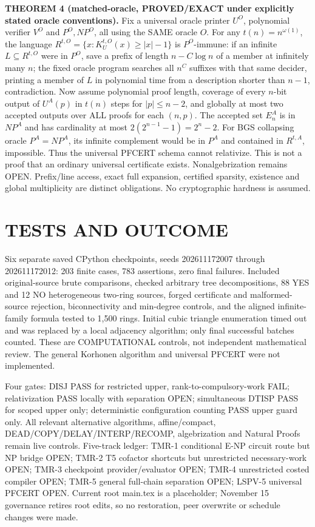 \documentclass{article}
\begin{document}
\textbf{THEOREM 4 (matched-oracle, PROVED/EXACT under explicitly stated oracle conventions).}
Fix a universal oracle printer $U^O$, polynomial verifier $V^O$ and $P^O,NP^O$, all using the SAME oracle $O$. For any $t(n)=n^{\omega(1)}$, the language $R^{t,O}=\{x:K_U^{t,O}(x)\ge |x|-1\}$ is $P^O$-immune: if an infinite $L\subseteq R^{t,O}$ were in $P^O$, save a prefix of length $n-C\log n$ of a member at infinitely many $n$; the fixed oracle program searches all $n^{C}$ suffixes with that same decider, printing a member of $L$ in polynomial time from a description shorter than $n-1$, contradiction. Now assume polynomial proof length, coverage of every $n$-bit output of $U^A(p)$ in $t(n)$ steps for $|p|\le n-2$, and globally at most two accepted outputs over ALL proofs for each $(n,p)$. The accepted set $E_n^A$ is in $NP^A$ and has cardinality at most $2(2^{n-1}-1)=2^n-2$. For BGS collapsing oracle $P^A=NP^A$, its infinite complement would be in $P^A$ and contained in $R^{t,A}$, impossible. Thus the universal PFCERT schema cannot relativize. This is not a proof that an ordinary universal certificate exists. Nonalgebrization remains OPEN. Prefix/line access, exact full expansion, certified sparsity, existence and global multiplicity are distinct obligations. No cryptographic hardness is assumed.

\section{TESTS AND OUTCOME}
Six separate saved CPython checkpoints, seeds 202611172007 through 202611172012: 203 finite cases, 783 assertions, zero final failures. Included original-source brute comparisons, checked arbitrary tree decompositions, 88 YES and 12 NO heterogeneous two-ring sources, forged certificate and malformed-source rejection, biconnectivity and min-degree controls, and the aligned infinite-family formula tested to 1,500 rings. Initial cubic triangle enumeration timed out and was replaced by a local adjacency algorithm; only final successful batches counted. These are COMPUTATIONAL controls, not independent mathematical review. The general Korhonen algorithm and universal PFCERT were not implemented.

Four gates: DISJ PASS for restricted upper, rank-to-compulsory-work FAIL; relativization PASS locally with separation OPEN; simultaneous DTISP PASS for scoped upper only; deterministic configuration counting PASS upper guard only. All relevant alternative algorithms, affine/compact, DEAD/COPY/DELAY/INTERP/RECOMP, algebrization and Natural Proofs remain live controls.
Five-track ledger: TMR-1 conditional E-NP circuit route but NP bridge OPEN; TMR-2 T5 cofactor shortcuts but unrestricted necessary-work OPEN; TMR-3 checkpoint provider/evaluator OPEN; TMR-4 unrestricted costed compiler OPEN; TMR-5 general full-chain separation OPEN; LSPV-5 universal PFCERT OPEN. Current root main.tex is a placeholder; November 15 governance retires root edits, so no restoration, peer overwrite or schedule changes were made.
\end{document}
